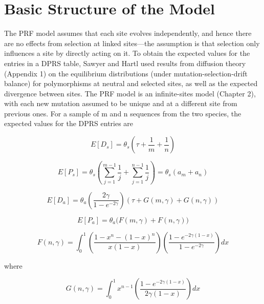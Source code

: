 \documentclass{article}
\begin{document}
\section{Basic Structure of the Model}
The PRF model assumes that each site evolves independently, and hence there are no effects from selection at linked sites—the assumption is that selection only influences a site by directly acting on it. To obtain the expected values for the entries in a DPRS table, Sawyer and Hartl used results from diffusion theory (Appendix 1) on the equilibrium distributions (under mutation-selection-drift balance) for polymorphisms at neutral and selected sites, as well as the expected divergence between sites. The PRF model is an infinite-sites model (Chapter 2), with each new mutation assumed to be unique and at a different site from previous ones. For a sample of m and n sequences from the two species, the expected values for the DPRS entries are

\begin{equation}
E[D_{s}]=\theta_{s}\left(\tau+\frac{1}{m}+\frac{1}{n}\right)
\tag{10.12a}
\label{eq:10_12a}
\end{equation}

\begin{equation}
E[P_{s}]=\theta_{s}\left(\sum_{j=1}^{m-1}\frac{1}{j}+\sum_{j=1}^{n-1}\frac{1}{j}\right)=\theta_{s}\left(a_{m}+a_{n}\right)
\tag{10.12b}
\label{eq:10_12b}
\end{equation}

\begin{equation}
E[D_{a}]=\theta_{a}\left(\frac{2\gamma}{1-e^{-2\gamma}}\right)\left(\tau+G(m,\gamma)+G(n,\gamma)\right)
\tag{10.12c}
\label{eq:10_12c}
\end{equation}

\begin{equation}
E[P_{a}]=\theta_{a}\Biggl(F(m,\gamma)+F(n,\gamma)\Biggr)
\tag{10.12d}
\label{eq:10_12d}
\end{equation}

\begin{equation}
F(n,\gamma)=\int_{0}^{1}\left(\frac{1-x^{n}-(1-x)^{n}}{x(1-x)}\right)\left(\frac{1-e^{-2\gamma(1-x)}}{1-e^{-2\gamma}}\right)dx
\tag{10.13a}
\label{eq:10_13a}
\end{equation}

where

\begin{equation}
G(n,\gamma)=\int_{0}^{1}x^{n-1}\left(\frac{1-e^{-2\gamma(1-x)}}{2\gamma(1-x)}\right)dx
\tag{10.13b}
\label{eq:10_13b}
\end{equation}
\end{document}
